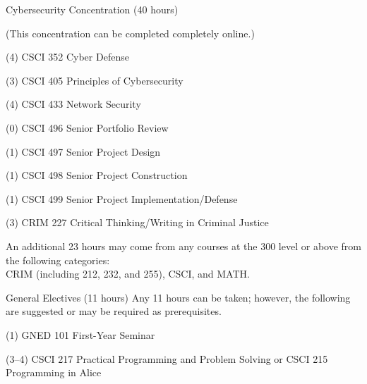 \begin{reqgroup}{Cybersecurity Concentration (40 hours)}
\begin{center}%
(This concentration can be completed completely online.)\vspace{-0.5em}%
\end{center}%
\begin{checklist}
\begin{minipage}[t]{0.5\linewidth}
	\item (4) CSCI 352 Cyber Defense
	\item (3) CSCI 405 Principles of Cybersecurity
	\item (4) CSCI 433 Network Security
	\item (0) CSCI 496 Senior Portfolio Review
\end{minipage}
\begin{minipage}[t]{0.5\linewidth}
	\item (1) CSCI 497 Senior Project Design
	\item (1) CSCI 498 Senior Project Construction
	\item (1) CSCI 499 Senior Project Implementation/Defense
	\item (3) CRIM 227 Critical Thinking/Writing in Criminal Justice
\end{minipage}
\end{checklist}

\tcblower

An additional 23 hours may come from any courses at the 300 level or above from the following categories:\\CRIM (including 212, 232, and 255), CSCI, and MATH.
\begin{checklist}
\begin{minipage}[t]{0.5\linewidth}
	\blankReq
	\blankReq
	\blankReq
	\blankReq
\end{minipage}
\begin{minipage}[t]{0.5\linewidth}
	\blankReq
	\blankReq
	\blankReq
	\blankReq
\end{minipage}
\end{checklist}
\end{reqgroup}

\begin{reqgroup}{General Electives (11 hours)}
Any 11 hours can be taken; however, the following are suggested or may be required as prerequisites.
\begin{checklist}
\begin{minipage}[t]{\linewidth}
	\item (1)	GNED 101	First-Year Seminar
	\item (3--4)	CSCI 217	Practical Programming and Problem Solving or CSCI 215	Programming in Alice\\
	\begin{minipage}[t]{0.5\linewidth}
		\blankReq
	\end{minipage}
	\begin{minipage}[t]{0.5\linewidth}
		\blankReq
	\end{minipage}
\end{minipage}
\end{checklist}
\end{reqgroup}

